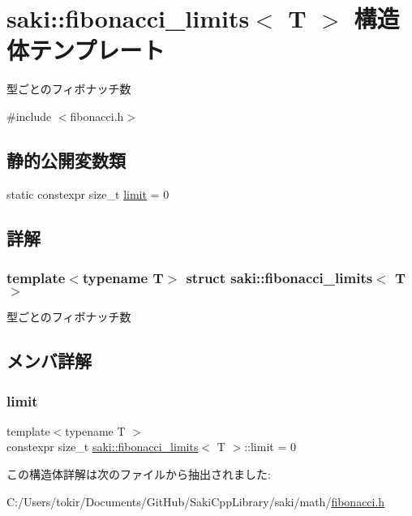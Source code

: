 \hypertarget{structsaki_1_1fibonacci__limits}{}\section{saki\+:\+:fibonacci\+\_\+limits$<$ T $>$ 構造体テンプレート}
\label{structsaki_1_1fibonacci__limits}


型ごとのフィボナッチ数  




{\ttfamily \#include $<$fibonacci.\+h$>$}

\subsection*{静的公開変数類}
\begin{DoxyCompactItemize}
\item 
static constexpr size\+\_\+t \mbox{\hyperlink{structsaki_1_1fibonacci__limits_a6dceda8ec10aee5a66f3032e48b2b58d}{limit}} = 0
\end{DoxyCompactItemize}


\subsection{詳解}
\subsubsection*{template$<$typename T$>$\newline
struct saki\+::fibonacci\+\_\+limits$<$ T $>$}

型ごとのフィボナッチ数 

\subsection{メンバ詳解}
\mbox{\label{structsaki_1_1fibonacci__limits_a6dceda8ec10aee5a66f3032e48b2b58d}} 
\subsubsection{\texorpdfstring{limit}{limit}}
{\footnotesize\ttfamily template$<$typename T $>$ \\
constexpr size\+\_\+t \mbox{\hyperlink{structsaki_1_1fibonacci__limits}{saki\+::fibonacci\+\_\+limits}}$<$ T $>$\+::limit = 0\hspace{0.3cm}{\ttfamily [static]}}



この構造体詳解は次のファイルから抽出されました\+:\begin{DoxyCompactItemize}
\item 
C\+:/\+Users/tokir/\+Documents/\+Git\+Hub/\+Saki\+Cpp\+Library/saki/math/\mbox{\hyperlink{fibonacci_8h}{fibonacci.\+h}}\end{DoxyCompactItemize}
